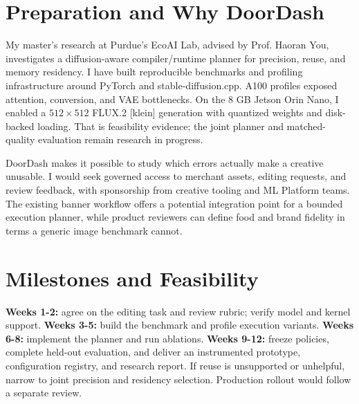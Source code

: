 \documentclass{article}
\begin{document}
\section{Preparation and Why DoorDash}
My master's research at Purdue's EcoAI Lab, advised by Prof. Haoran You, investigates a diffusion-aware compiler/runtime planner for precision, reuse, and memory residency. I have built reproducible benchmarks and profiling infrastructure around PyTorch and stable-diffusion.cpp. A100 profiles exposed attention, conversion, and VAE bottlenecks. On the 8 GB Jetson Orin Nano, I enabled a $512\times512$ FLUX.2 [klein] generation with quantized weights and disk-backed loading. That is feasibility evidence; the joint planner and matched-quality evaluation remain research in progress.

DoorDash makes it possible to study which errors actually make a creative unusable. I would seek governed access to merchant assets, editing requests, and review feedback, with sponsorship from creative tooling and ML Platform teams. The existing banner workflow offers a potential integration point for a bounded execution planner, while product reviewers can define food and brand fidelity in terms a generic image benchmark cannot.~\citep{doordashBanner2025,doordashPhotoTools2025}

\section{Milestones and Feasibility}
\textbf{Weeks 1-2:} agree on the editing task and review rubric; verify model and kernel support. \textbf{Weeks 3-5:} build the benchmark and profile execution variants. \textbf{Weeks 6-8:} implement the planner and run ablations. \textbf{Weeks 9-12:} freeze policies, complete held-out evaluation, and deliver an instrumented prototype, configuration registry, and research report. If reuse is unsupported or unhelpful, narrow to joint precision and residency selection. Production rollout would follow a separate review.
\end{document}
